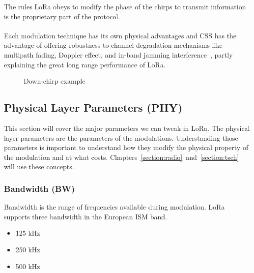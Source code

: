 The rules LoRa obeys to modify the phase of the chirps to transmit information
is the proprietary part of the protocol.

\paragraph{}

Each modulation technique has its own physical advantages and
CSS has the advantage of offering robustness to channel degradation
mechanisms like multipath fading, Doppler effect, and in-band jamming
interference~\cite{semtech:modulationbasics}, partly explaining the great long
range performance of LoRa.

\begin{figure}[H]
\centering
{}
\caption{Down-chirp example\label{fig:downchirp}}
\end{figure}

\subsection{Physical Layer Parameters (PHY)}

This section will cover the major parameters we can tweak in LoRa.
The physical layer parameters are the parameters of the modulations.
Understanding those parameters is important to understand how they modify
the physical property of the modulation and at what costs.
Chapters~\ref{section:radio}~and~\ref{section:tsch} will use these concepts.

\subsubsection{Bandwidth (BW)\label{section:bw}}

Bandwidth is the range of frequencies available during modulation.
LoRa supports three bandwidth in the European ISM band.

\begin{itemize}
    \item 125 kHz
    \item 250 kHz
    \item 500 kHz
\end{itemize}

